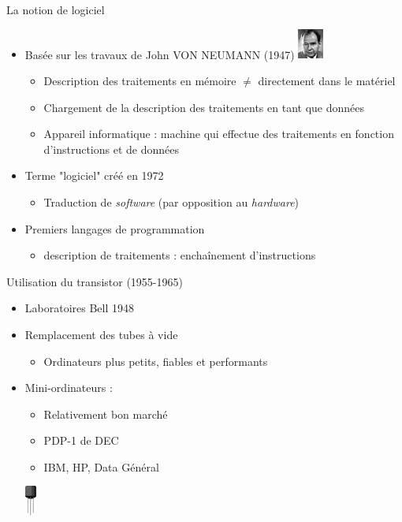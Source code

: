 \begin{frame}{La notion de logiciel \cite{wp-neumann}}
\begin{itemize}
\item Basée sur les travaux de John VON NEUMANN (1947) \includegraphics[height=1cm]{../illustration/JohnvonNeumann-LosAlamos.jpg}
\begin{itemize}
\item Description des traitements en mémoire $\ne$ directement dans le matériel
\item Chargement de la description des traitements en tant que données
\item Appareil informatique : machine qui effectue des traitements en fonction d'instructions et de données
\end{itemize}
\item Terme "logiciel" créé en 1972
\begin{itemize}
\item Traduction de \textit{software} (par opposition au \textit{hardware})
\end{itemize}
\item Premiers langages de programmation
\begin{itemize}
\item description de traitements : enchaînement d'instructions
\end{itemize}
\end{itemize}

\end{frame}

\begin{frame}{Utilisation du transistor (1955-1965)}
\begin{itemize}
\item Laboratoires Bell 1948
\item Remplacement des tubes à vide
\begin{itemize}
\item Ordinateurs plus petits, fiables et performants
\end{itemize}
\item Mini-ordinateurs :
\begin{itemize}
\item Relativement bon marché
\item PDP-1 de DEC
\item IBM, HP, Data Général
\end{itemize}
	\begin{center}
	\includegraphics[height=1cm,bb=0 0 95 257]{../illustration/transistor.png}
	\end{center}
\end{itemize}
\end{frame}

